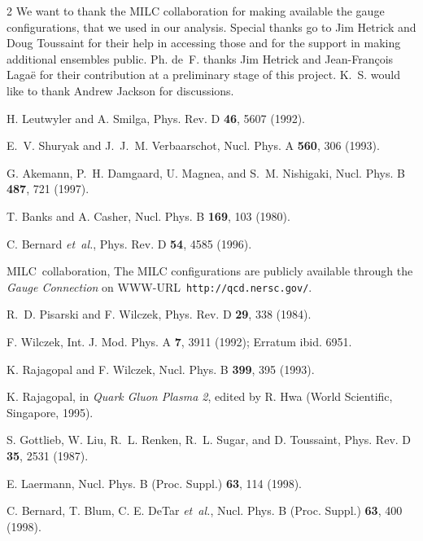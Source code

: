 \begin{multicols}{2}
\acknowledgements
We want to thank the MILC collaboration for making available the gauge
configurations, that we used in our analysis. Special thanks go to Jim Hetrick
and Doug Toussaint for their help in accessing those and for the support in
making additional ensembles public.  Ph. de~F. thanks Jim Hetrick and
Jean-Fran\c{c}ois Laga\"e for their contribution at a preliminary stage of this
project. K.~S. would like  to thank Andrew Jackson  for discussions.


\begin{references}


H. Leutwyler and A. Smilga, Phys. Rev. D {\bf 46},  5607  (1992).

E.~V. Shuryak and J.~J.~M. Verbaarschot, Nucl. Phys. A {\bf 560},  306  (1993).

G. Akemann, P.~H. Damgaard, U. Magnea, and S.~M. Nishigaki, Nucl. Phys. B {\bf
  487},  721  (1997).

T. Banks and A. Casher, Nucl. Phys. B {\bf 169}, 103 (1980).

C. Bernard {\it et~al.}, Phys. Rev. D {\bf 54},  4585  (1996).

MILC{~}collaboration, The MILC configurations are publicly available through
  the \textsl{Gauge Connection} on WWW-URL~{\tt http://qcd.nersc.gov/}.

R.~D. Pisarski and F. Wilczek, Phys. Rev. D {\bf 29}, 338 (1984).

F. Wilczek, Int. J. Mod. Phys. A {\bf 7},  3911  (1992);
Erratum ibid. 6951. 

K. Rajagopal and F. Wilczek, Nucl. Phys. B {\bf 399},  395  (1993).

K. Rajagopal,  in {\em Quark Gluon Plasma 2}, edited by R. Hwa (World
  Scientific, Singapore, 1995).

S. Gottlieb, W. Liu, R.~L. Renken, R.~L. Sugar, and D. Toussaint, 
Phys. Rev. D {\bf 35}, 2531 (1987).

E. Laermann, Nucl. Phys. B (Proc. Suppl.) {\bf 63},  114  (1998).

C. Bernard, T. Blum, C. E. DeTar  {\it et~al.}, Nucl. Phys. B (Proc. Suppl.) 
{\bf 63},  400  (1998).


\end{references}
\end{multicols}
